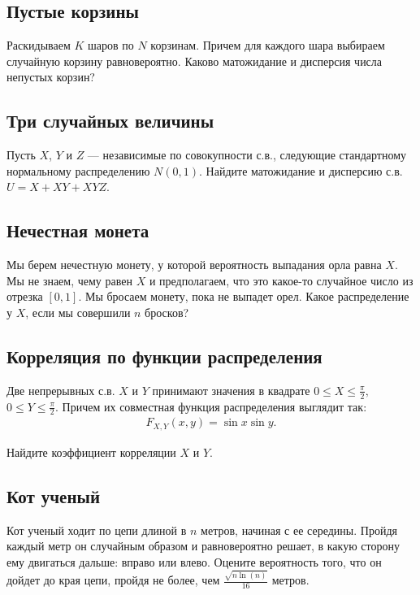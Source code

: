 \documentclass[12pt]{article}
\begin{document}
\subsection{Пустые корзины}

Раскидываем $K$ шаров по $N$ корзинам. Причем для каждого шара выбираем случайную корзину равновероятно. Каково матожидание и дисперсия числа непустых корзин?



\subsection{Три случайных величины}

Пусть $X$, $Y$ и $Z$ --- независимые по совокупности с.в., следующие стандартному нормальному распределению $N(0, 1)$. Найдите матожидание и дисперсию с.в. $U = X + XY + XYZ$. 



\subsection{Нечестная монета}

Мы берем нечестную монету, у которой вероятность выпадания орла равна $X$. Мы не знаем, чему равен $X$ и предполагаем, что это какое-то случайное число из отрезка $[0, 1]$. Мы бросаем монету, пока не выпадет орел. Какое распределение у $X$, если мы совершили $n$ бросков?



\subsection{Корреляция по функции распределения}

Две непрерывных с.в. $X$ и $Y$ принимают значения в квадрате $0 \le X \le \frac{\pi}{2},$ $0 \le Y \le \frac{\pi}{2}$. Причем их совместная функция распределения выглядит так:
\begin{align*}
    F_{X, Y} (x, y) = \sin x \sin y.
\end{align*}

Найдите коэффициент корреляции $X$ и $Y$.



\subsection{Кот ученый}

Кот ученый ходит по цепи длиной в $n$ метров, начиная с ее середины. Пройдя каждый метр он случайным образом и равновероятно решает, в какую сторону ему двигаться дальше: вправо или влево. Оцените вероятность того, что он дойдет до края цепи, пройдя не более, чем $\frac{\sqrt{n \ln(n)}}{16}$ метров.
\end{document}

